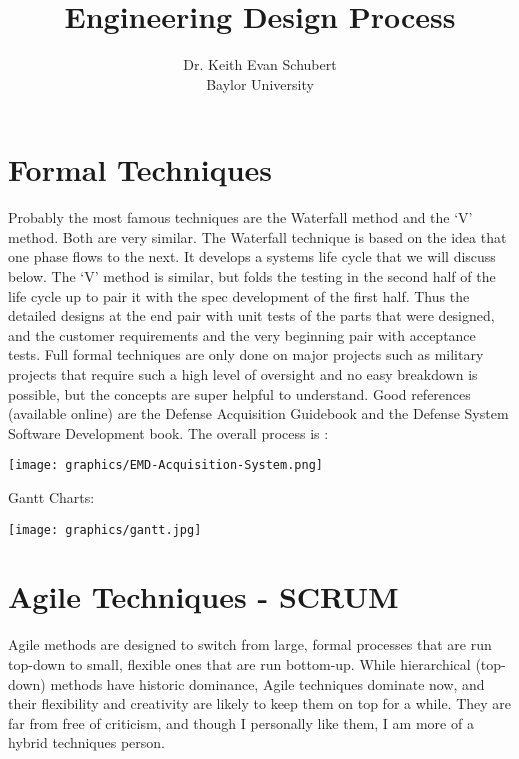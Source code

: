 \documentclass{article}
\title{Engineering Design Process}
\author{Dr. Keith Evan Schubert\\ Baylor University}
\begin{document}
\maketitle




\section{Formal Techniques}

Probably the most famous techniques are the Waterfall method and the `V' method.  Both are very similar.  The Waterfall technique is based on the idea that one phase flows to the next.  It develops a systems life cycle that we will discuss below.  The `V' method is similar, but folds the testing in the second half of the life cycle up to pair it with the spec development of the first half.  Thus the detailed designs at the end pair with unit tests of the parts that were designed, and the customer requirements and the very beginning pair with acceptance tests.  Full formal techniques are only done on major projects such as military projects that require such a high level of oversight and no easy breakdown is possible, but the concepts are super helpful to understand.  Good references (available online) are the Defense Acquisition Guidebook and the Defense System Software Development book.  The overall process is :%

\texttt{[image: graphics/EMD-Acquisition-System.png]}

Gantt Charts:

\texttt{[image: graphics/gantt.jpg]}

\section{Agile Techniques - SCRUM}

Agile methods are designed to switch from large, formal processes that are run top-down to small, flexible ones that are run bottom-up.  While hierarchical (top-down) methods have historic dominance, Agile techniques dominate now, and their flexibility and creativity are likely to keep them on top for a while.  They are far from free of criticism, and though I personally like them, I am more of a hybrid techniques person.
\end{document}

